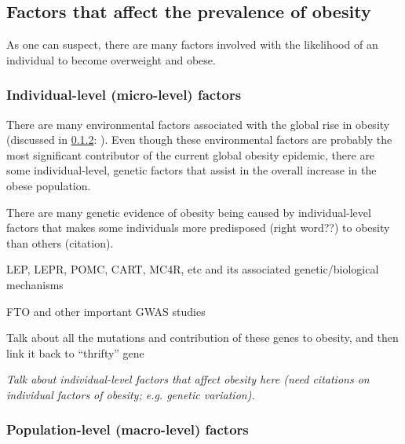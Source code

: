 \subsection{Factors that affect the prevalence of obesity}
\label{sub:factors_that_affect_the_prevalence_of_obesity}

As one can suspect, there are many factors involved with the likelihood of an individual to become overweight and obese.

\subsubsection{Individual-level (micro-level) factors}
\label{ssub:Individual-level_(micro-level)_factors}

There are many environmental factors associated with the global rise in obesity (discussed in \cref{ssub:Population-level_(macro-level)_factors}: ).
Even though these environmental factors are probably the most significant contributor of the current global obesity epidemic, there are some individual-level, genetic factors that assist in the overall increase in the obese population.



There are many genetic evidence of obesity being caused by individual-level factors that makes some individuals more predisposed (right word??) to obesity than others (citation).


LEP, LEPR, POMC, CART, MC4R, etc and its associated genetic/biological mechanisms\\

\citep{Montague1997}
\citep{Clement1998}
\citep{Jackson1997}
\citep{Krude1998}
\citep{Farooqi2003}
\citep{Kublaoui2006}
\citep{Dubern2001}
\citep{Challis2002}

FTO and other important GWAS studies \\

\citep{Frayling2007}
\citep{Dina2007}
\citep{Scuteri2007}
\citep{Gerken2007}

Talk about all the mutations and contribution of these genes to obesity, and then link it back to ``thrifty'' gene
\citep{Neel1962}

\textit{Talk about individual-level factors that affect obesity here (need citations on individual factors of obesity; e.g. genetic variation).}

\subsubsection{Population-level (macro-level) factors}
\label{ssub:Population-level_(macro-level)_factors}


